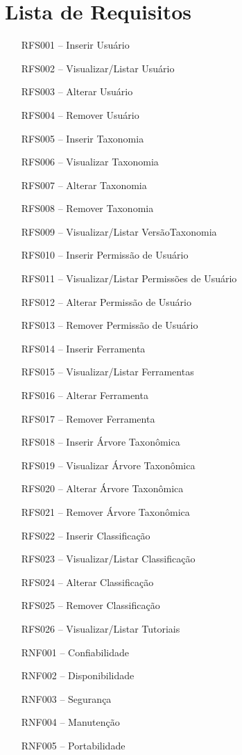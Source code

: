 \chapter{Lista de Requisitos}
\label{apendice:b}

\begin{itemize}
    \item [RFS001] – Inserir Usuário
    \item [RFS002] – Visualizar/Listar Usuário
    \item [RFS003] – Alterar Usuário
    \item [RFS004] – Remover Usuário
    \item [RFS005] – Inserir Taxonomia
    \item [RFS006] – Visualizar Taxonomia
    \item [RFS007] – Alterar Taxonomia
    \item [RFS008] – Remover Taxonomia
    \item [RFS009] – Visualizar/Listar VersãoTaxonomia
    \item [RFS010] – Inserir Permissão de Usuário
    \item [RFS011] – Visualizar/Listar Permissões de Usuário 
    \item [RFS012] – Alterar Permissão de Usuário
    \item [RFS013] – Remover Permissão de Usuário
    \item [RFS014] – Inserir Ferramenta
    \item [RFS015] – Visualizar/Listar Ferramentas
    \item [RFS016] – Alterar Ferramenta
    \item [RFS017] – Remover Ferramenta
    \item [RFS018] – Inserir Árvore Taxonômica
    \item [RFS019] – Visualizar Árvore Taxonômica
    \item [RFS020] – Alterar Árvore Taxonômica
    \item [RFS021] – Remover Árvore Taxonômica
    \item [RFS022] – Inserir Classificação
    \item [RFS023] – Visualizar/Listar Classificação
    \item [RFS024] – Alterar Classificação
    \item [RFS025] – Remover Classificação
    \item [RFS026] – Visualizar/Listar Tutoriais
    \item [RNF001] – Confiabilidade
    \item [RNF002] – Disponibilidade
    \item [RNF003] – Segurança
    \item [RNF004] – Manutenção
    \item [RNF005] – Portabilidade
\end{itemize}